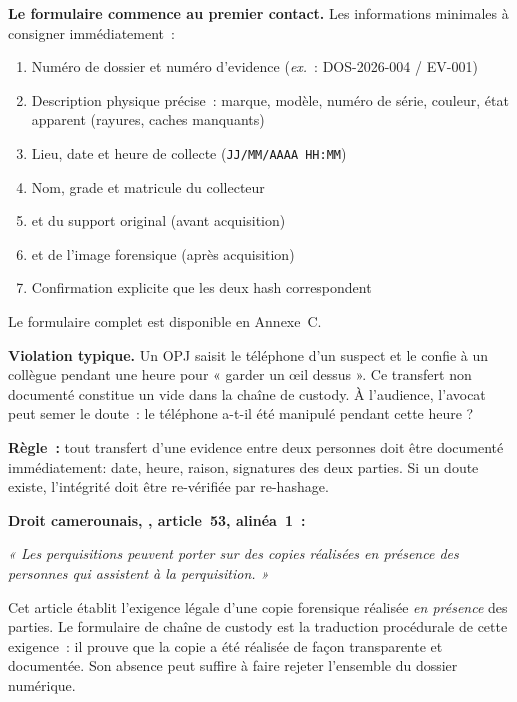\begin{boxcustody}
\textbf{Le formulaire commence au premier contact.}
Les informations minimales à consigner immédiatement~:
\begin{enumerate}
    \item Numéro de dossier et numéro d'evidence (\textit{ex.}~: DOS-2026-004 / EV-001)
    \item Description physique précise~: marque, modèle, numéro de série,
          couleur, état apparent (rayures, caches manquants)
    \item Lieu, date et heure de collecte (\texttt{JJ/MM/AAAA HH:MM})
    \item Nom, grade et matricule du collecteur
    \item {} et  du support original (avant acquisition)
    \item {} et  de l'image forensique (après acquisition)
    \item Confirmation explicite que les deux hash correspondent
\end{enumerate}
Le formulaire complet est disponible en Annexe~C.
\end{boxcustody}

\begin{boxalert}
\textbf{Violation typique.} Un OPJ saisit le téléphone d'un suspect et le
confie à un collègue pendant une heure pour « garder un \oe il dessus ».
Ce transfert non documenté constitue un vide dans la chaîne de custody.
À l'audience, l'avocat peut semer le doute~: le téléphone a-t-il été
manipulé pendant cette heure ?

\textbf{Règle~:} tout transfert d'une evidence entre deux personnes doit
être documenté immédiatement: date, heure, raison, signatures des deux
parties. Si un doute existe, l'intégrité doit être re-vérifiée par re-hashage.
\end{boxalert}

\begin{boxjuris}
\textbf{Droit camerounais, , article~53, alinéa~1~:}~\cite{cameroun2010a}

\medskip
\textit{« Les perquisitions \textelp{} peuvent porter sur des copies réalisées
en présence des personnes qui assistent à la perquisition. »}

\medskip
Cet article établit l'exigence légale d'une copie forensique réalisée
\emph{en présence} des parties. Le formulaire de chaîne de custody est la
traduction procédurale de cette exigence~: il prouve que la copie a été
réalisée de façon transparente et documentée. Son absence peut suffire à
faire rejeter l'ensemble du dossier numérique.
\end{boxjuris}

